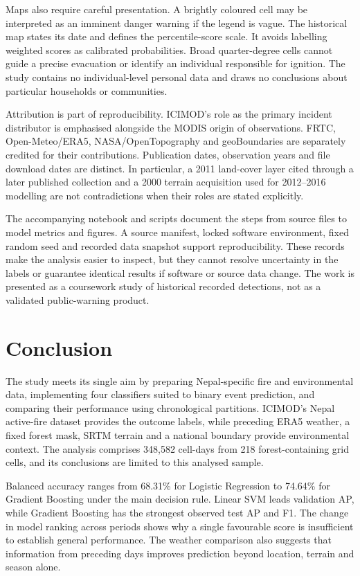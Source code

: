 \documentclass[conference,a4paper]{IEEEtran}
\begin{document}
Maps also require careful presentation. A brightly coloured cell may be interpreted as an imminent danger warning if the legend is vague. The historical map states its date and defines the percentile-score scale. It avoids labelling weighted scores as calibrated probabilities. Broad quarter-degree cells cannot guide a precise evacuation or identify an individual responsible for ignition. The study contains no individual-level personal data and draws no conclusions about particular households or communities.

Attribution is part of reproducibility. ICIMOD's role as the primary incident distributor is emphasised alongside the MODIS origin of observations. FRTC, Open-Meteo/ERA5, NASA/OpenTopography and geoBoundaries are separately credited for their contributions. Publication dates, observation years and file download dates are distinct. In particular, a 2011 land-cover layer cited through a later published collection and a 2000 terrain acquisition used for 2012--2016 modelling are not contradictions when their roles are stated explicitly.

The accompanying notebook and scripts document the steps from source files to model metrics and figures. A source manifest, locked software environment, fixed random seed and recorded data snapshot support reproducibility. These records make the analysis easier to inspect, but they cannot resolve uncertainty in the labels or guarantee identical results if software or source data change. The work is presented as a coursework study of historical recorded detections, not as a validated public-warning product.

\section{Conclusion}
The study meets its single aim by preparing Nepal-specific fire and environmental data, implementing four classifiers suited to binary event prediction, and comparing their performance using chronological partitions. ICIMOD’s Nepal active-fire dataset provides the outcome labels, while preceding ERA5 weather, a fixed forest mask, SRTM terrain and a national boundary provide environmental context. The analysis comprises 348,582 cell-days from 218 forest-containing grid cells, and its conclusions are limited to this analysed sample.

Balanced accuracy ranges from 68.31\% for Logistic Regression to 74.64\% for Gradient Boosting under the main decision rule. Linear SVM leads validation AP, while Gradient Boosting has the strongest observed test AP and F1. The change in model ranking across periods shows why a single favourable score is insufficient to establish general performance. The weather comparison also suggests that information from preceding days improves prediction beyond location, terrain and season alone.
\end{document}
